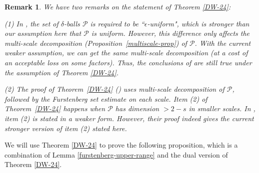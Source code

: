 \documentclass{amsart}
\numberwithin{equation}{section}
\newtheorem{remark}[theorem]{Remark}
\newcommand{\de}{\delta}
\newcommand{\cp}{\mathcal P}
\begin{document}
\begin{remark}
\rm
 We have two remarks on the statement of Theorem \ref{DW-24}:

(1) In \cite[Theorem 5.4]{Demeter-Wang}, the set of $\de$-balls $\cp$ is required to be ``$\epsilon$-uniform", which is stronger than our assumption here that $\cp$ is uniform.
However, this difference only affects the multi-scale decomposition (Proposition~\ref{multiscale-prop}) of $\cp$.
With the current weaker assumption, we can get the same multi-scale decomposition (at a cost of an acceptable loss on some factors).
Thus, the conclusions of \cite[Theorem 5.4]{Demeter-Wang} are still true under the assumption of Theorem \ref{DW-24}.

\smallskip

(2) The proof of Theorem~\ref{DW-24} (\cite[Theorem 5.4]{Demeter-Wang})  uses multi-scale decomposition of $\cp$, followed by  the Furstenberg set estimate  \cite{ren2023furstenberg} on each scale. 
Item (2) of Theorem~\ref{DW-24} happens when $\cp$ has dimension $>2-s$ in smaller scales. 
In  \cite[Theorem 5.4]{Demeter-Wang}, item (2) is stated in a weaker form. 
However, their proof indeed gives the current stronger version of item (2) stated here. 

\end{remark}



We will use Theorem \ref{DW-24} to prove the following proposition, which is a combination of Lemma \ref{furstenberg-upper-range} and the dual version of Theorem \ref{DW-24}.
\end{document}
